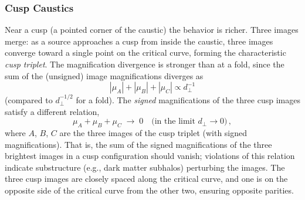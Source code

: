 \subsubsection{Cusp Caustics}

Near a cusp (a pointed corner of the caustic) the behavior is
richer.  Three images merge: as a source approaches a cusp from
inside the caustic, three images converge toward a single point on
the critical curve, forming the characteristic \emph{cusp triplet}.
The magnification divergence is stronger than at a fold, since the
sum of the (unsigned) image magnifications diverges as
\begin{equation}
    |\mu_A| + |\mu_B| + |\mu_C| \propto d_{\perp}^{-1}
    \label{eq:cusp_magnification}
\end{equation}
(compared to $d_\perp^{-1/2}$ for a fold).  The \emph{signed}
magnifications of the three cusp images satisfy a different relation,
\begin{equation}
    \mu_A + \mu_B + \mu_C \;\to\; 0 \quad
    \text{(in the limit $d_\perp \to 0$)} \,,
    \label{eq:cusp_relation}
\end{equation}
where $A$, $B$, $C$ are the three images of the cusp triplet (with
signed magnifications).  That is, the sum of the signed
magnifications of the three brightest images in a cusp configuration
should vanish; violations of this relation indicate substructure
(e.g., dark matter subhalos) perturbing the images.  The three cusp
images are closely spaced along the critical curve, and one is on the
opposite side of the critical curve from the other two, ensuring
opposite parities.

